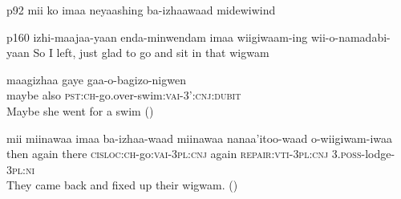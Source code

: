 \documentclass[oldfontcommands,oneside,a4paper,11pt]{article}
\begin{document}
p92 mii ko imaa neyaashing ba-izhaawaad midewiwind

p160 
izhi-maajaa-yaan enda-minwendam imaa wiigiwaam-ing wii-o-namadabi-yaan
So I left, just glad to go and sit in that wigwam

\begin{exe}
\ex 
\gll
maagizhaa gaye gaa-o-bagizo-nigwen \\
maybe also \textsc{pst:ch}-go.over-swim:\textsc{vai}-\textsc{3':cnj:dubit} \\
\glt Maybe she went for a swim (\citealt[74]{kegg93portage})
\end{exe}
\begin{exe}
\ex 
\gll
mii miinawaa imaa ba-izhaa-waad miinawaa nanaa'itoo-waad o-wiigiwam-iwaa \\
then again there \textsc{cisloc:ch}-go:\textsc{vai}-\textsc{3pl:cnj} again \textsc{repair:vti}-\textsc{3pl:cnj} \textsc{3.poss}-lodge-\textsc{3pl:ni} \\
\glt They came back and fixed up their wigwam. (\citealt[32]{kegg93portage})
\end{exe}





 
\end{document}

